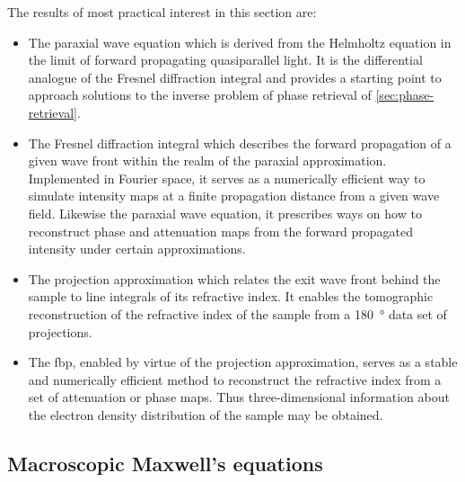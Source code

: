 \documentclass[
twoside,
openright,
titlepage,
numbers=noenddot,
headinclude,
fleqn,
a4paper,
footinclude=true,
cleardoublepage=empty,
abstractoff,
BCOR=5mm,
paper=a4,
fontsize=11pt,
british,ngerman,american,
]{scrreprt}
\begin{document}
The results of most practical interest in this section are:
\begin{itemize}
\item The paraxial wave equation which is derived from the Helmholtz
  equation in the limit of forward propagating quasi\hyph parallel
  light.  It is the differential analogue of the Fresnel diffraction
  integral and provides a starting point to approach solutions to the
  inverse problem of phase retrieval of \cref{sec:phase-retrieval}.
\item The Fresnel diffraction integral which describes the forward
  propagation of a given wave front within the realm of the paraxial
  approximation.  Implemented in Fourier space, it serves as a
  numerically efficient way to simulate intensity maps at a finite
  propagation distance from a given wave field.  Likewise the paraxial
  wave equation, it prescribes ways on how to reconstruct phase and
  attenuation maps from the forward propagated intensity under certain
  approximations.
\item The projection approximation which relates the exit wave front
  behind the sample to line integrals of its refractive index.  It
  enables the tomographic reconstruction of the refractive index of
  the sample from a \SI{180}{\degree} data set of projections.
\item The \acf{fbp}, enabled by virtue of the projection approximation,
  serves as a stable and numerically efficient method to reconstruct
  the refractive index from a set of attenuation or phase maps.  Thus
  three-dimensional information about the electron density
  distribution of the sample may be obtained.
\end{itemize}

\subsection{Macroscopic Maxwell's equations}
\label{sec:macroscopic-maxwell-equations}
\end{document}
